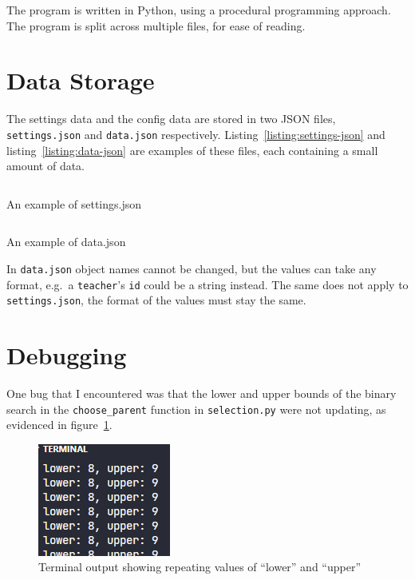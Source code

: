 The program is written in Python, using a procedural programming approach.
The program is split across multiple files, for ease of reading.

\section{Data Storage}

The settings data and the config data are stored in two JSON files, 
\verb|settings.json| and \verb|data.json| respectively.
Listing~\ref*{listing:settings-json} and listing~\ref*{listing:data-json} are
examples of these files, each containing a small amount of data.

\begin{listing}[!ht]
	\inputminted[linenos, fontsize=\footnotesize]{json}{code/settings_template.json}
	\caption{An example of settings.json}
	\label{listing:settings-json}
\end{listing}

\begin{listing}[!ht]
	\inputminted[linenos, fontsize=\footnotesize]{json}{code/data_template.json}
	\caption{An example of data.json}
	\label{listing:data-json}
\end{listing}

In \verb|data.json| object names cannot be changed, but the values can take any 
format, e.g.\ a \verb|teacher|'s \verb|id| could be a string instead.
The same does not apply to \verb|settings.json|, the format of the values must 
stay the same.

\newpage

\section{Debugging}

One bug that I encountered was that the lower and upper bounds of the binary 
search in the \verb|choose_parent| function in \verb|selection.py| were not
updating, as evidenced in figure~\ref*{fig:terminal-output-1}.
\begin{figure}[ht]
	\centering
	\includegraphics[scale=0.8]{images/binary-search-2}
	\caption{Terminal output showing repeating values of ``lower'' and 
		``upper''}
	\label{fig:terminal-output-1}
\end{figure}

